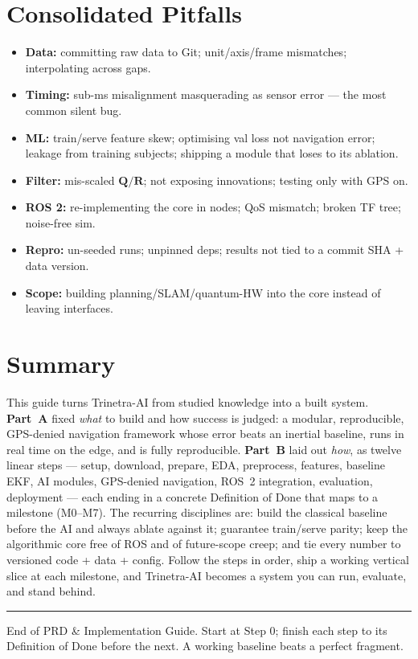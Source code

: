 \documentclass[11pt]{article}
\newcommand{\vv}[1]{\mathbf{#1}}
\begin{document}
\section{Consolidated Pitfalls}\label{sec:pitfalls}
\begin{itemize}[leftmargin=1.4em,itemsep=0pt]
\item \textbf{Data:} committing raw data to Git; unit/axis/frame mismatches; interpolating across gaps.
\item \textbf{Timing:} sub-ms misalignment masquerading as sensor error --- the most common silent bug.
\item \textbf{ML:} train/serve feature skew; optimising val loss not navigation error; leakage from training subjects; shipping a module that loses to its ablation.
\item \textbf{Filter:} mis-scaled $\vv{Q}/\vv{R}$; not exposing innovations; testing only with GPS on.
\item \textbf{ROS 2:} re-implementing the core in nodes; QoS mismatch; broken TF tree; noise-free sim.
\item \textbf{Repro:} un-seeded runs; unpinned deps; results not tied to a commit SHA + data version.
\item \textbf{Scope:} building planning/SLAM/quantum-HW into the core instead of leaving interfaces.
\end{itemize}

\section{Summary}\label{sec:summary}
This guide turns Trinetra-AI from studied knowledge into a built system. \textbf{Part~A} fixed
\emph{what} to build and how success is judged: a modular, reproducible, GPS-denied navigation
framework whose error beats an inertial baseline, runs in real time on the edge, and is fully
reproducible. \textbf{Part~B} laid out \emph{how}, as twelve linear steps --- setup, download,
prepare, EDA, preprocess, features, baseline EKF, AI modules, GPS-denied navigation, ROS~2
integration, evaluation, deployment --- each ending in a concrete Definition of Done that maps to
a milestone (M0--M7). The recurring disciplines are: build the classical baseline before the AI
and always ablate against it; guarantee train/serve parity; keep the algorithmic core free of ROS
and of future-scope creep; and tie every number to versioned code + data + config. Follow the
steps in order, ship a working vertical slice at each milestone, and Trinetra-AI becomes a system
you can run, evaluate, and stand behind.

\vspace{8pt}\hrule\vspace{4pt}
{\small\color{soft} End of PRD \& Implementation Guide. Start at Step 0; finish each step to its Definition of Done before the next. A working baseline beats a perfect fragment.}
\end{document}
